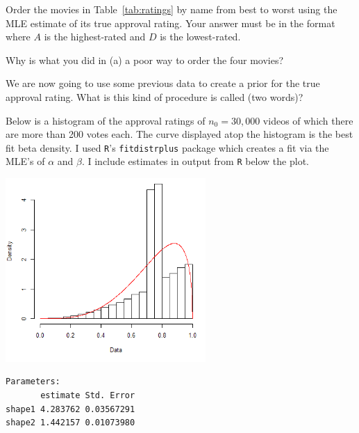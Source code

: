 \documentclass[12pt]{article}
\begin{document}



\benum

 Order the movies in Table~\ref{tab:ratings} by name from best to worst using the MLE estimate of its true approval rating. Your answer must be in the format  where $A$ is the highest-rated and $D$ is the lowest-rated.  %

 Why is what you did in (a) a poor way to order the four movies? %

 We are now going to use some previous data to create a prior for the true approval rating. What is this kind of procedure is called (two words)? %

Below is a histogram of the approval ratings of $n_0 = 30,000$ videos of which there are more than 200 votes each. The curve displayed atop the histogram is the best fit beta density. I used \texttt{R}'s  \texttt{fitdistrplus} package which creates a fit via the MLE's of $\alpha$ and $\beta$. I include estimates in output from \texttt{R} below the plot. 

  \begin{multicols}{2}

\includegraphics[width=3in]{fitdist.png}



 \begin{minipage}{0.4\linewidth}
\vspace{2cm}
\begin{verbatim}
Parameters:
       estimate Std. Error
shape1 4.283762 0.03567291
shape2 1.442157 0.01073980
\end{verbatim}
    \end{minipage}
  \end{multicols}
\end{document}
